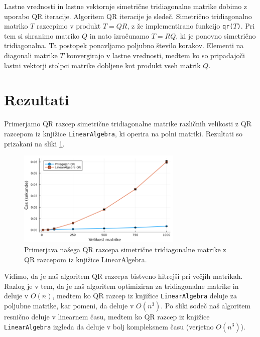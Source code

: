 \documentclass[11pt, titlepage]{article}
\begin{document}
Lastne vrednosti in lastne vektornje simetrične tridiagonalne matrike dobimo z uporabo QR iteracije. Algoritem QR iteracije je sledeč. Simetrično tridiagonalno matriko $T$ razcepimo v produkt $T = QR$, z že implementirano funkcijo \texttt{qr($T$)}.
Pri tem si shranimo matriko $Q$ in nato izračunamo $T = RQ$, ki je ponovno simetrično tridiagonalna. Ta postopek ponavljamo poljubno število korakov. Elementi na diagonali matrike $T$ konvergirajo v lastne vrednosti, medtem ko so pripadajoči lastni vektorji stolpci matrike dobljene kot produkt vseh matrik $Q$.

\section{Rezultati}
Primerjamo QR razcep simetrične tridiagonalne matrike različnih velikosti z QR razcepom iz knjižice \texttt{LinearAlgebra}, ki operira na polni matriki. Rezultati so prizakani na sliki \ref{fig:qr_comparison}.
\begin{figure}[ht]
    \centering
    \includegraphics[width=0.7\textwidth]{figures/qr_performance_comparison.png}
    \caption{Primerjava našega QR razcepa simetrične tridiagonalne matrike z QR razcepom iz knjižice LinearAlgebra.}
    \label{fig:qr_comparison}
\end{figure}

Vidimo, da je naš algoritem QR razcepa bistveno hitrejši pri večjih matrikah. Razlog je v tem, da je naš algoritem optimiziran za tridiagonalne matrike in deluje v $O(n)$, medtem ko QR razcep iz knjižice \texttt{LinearAlgebra} deluje za poljubne matrike, kar pomeni, da deluje v $O(n^3)$.
Po sliki sodeč naš algoritem resnično deluje v linearnem času, medtem ko QR razcep iz knjižice \texttt{LinearAlgebra} izgleda da deluje v bolj kompleksnem času (verjetno $O(n^3)$).
\end{document}
